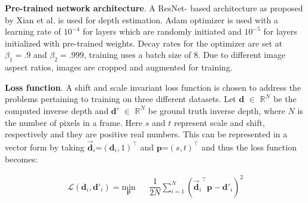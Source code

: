 \documentclass[journal]{IEEEtran}
\begin{document}

\textbf{Pre-trained network architecture}. A ResNet- based architecture as proposed by Xian et al. \cite{xian2018monocular} is used for depth estimation. Adam optimizer is used with a learning rate of    
$ 10^{-4} $ for layers which are randomly initiated and $ 10^{-5} $ for layers initialized with pre-trained weights. Decay rates for the optimizer are set at $\beta_{1}=.9$ and $ \beta_{2}=.999 $, training uses a batch size of 8. Due to different image aspect ratios, images are cropped and augmented for training.

\textbf{Loss function}. A shift and scale invariant loss function is chosen to address the problems pertaining to training on three different datasets. Let $\mathbf{d}$ $\in$  $\mathbb{R}^\mathit{N}$ be the computed inverse depth and $\mathbf{d'}$ $ \in $ $\mathbb{R}^\mathit{N}$ be ground truth inverse depth, where $\mathit{N}$ is the number of pixels in a frame. Here $s$ and $t$ represent scale and shift, respectively and they are positive real numbers. This can be represented in a vector form by taking $\vec{\mathbf{d}}_{i}$=$(\mathbf{d}_{i},1)^\intercal$ and $\mathbf{p}$=$(s,t)^\intercal$ and thus the loss function becomes: 


\begin{equation}\label{eq:a}
\begin{aligned}
\mathcal{L}(\mathbf{d}_{i},\mathbf{d'}_{i}) = \underset{\mathbf{p}}{\text{min}} && \dfrac{1}{2\mathit{N}} \sum_{i=1}^{\mathit{N}}({\vec{\mathbf{d}}_{i}}^\intercal\mathbf{p}-\mathbf{d'}_{i})^2
\end{aligned}
\end{equation}
\end{document}
